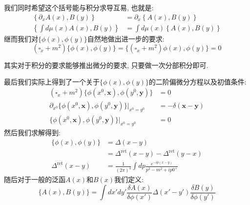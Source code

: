 我们同时希望这个括号能与积分求导互易, 也就是:
\begin{align}
    \left\{\partial_x A(x), B(y)\right\}&=\partial_x\left\{A(x), B(y)\right\}\\
    \left\{\int d\mu(x)A(x), B(y)\right\}&=\int d\mu(x)\left\{A(x), B(y)\right\}
\end{align}
继而我们对$\{\phi(x), \phi(y)\}$自然地做出进一步的要求:
\begin{equation}
    (\square_x+m^2)\{\phi(x), \phi(y)\}=\{(\square_x+m^2)\phi(x), \phi(y)\}=0
\end{equation}
\begin{remark}
    其实对于积分的要求能够推出微分的要求, 只要做一次分部积分即可.
\end{remark}
最后我们实际上得到了一个关于$\{\phi(x), \phi(y)\}$的二阶偏微分方程以及初值条件:
\begin{align}
    (\square_x+m^2)\{\phi(x^0, \mathbf{x}), \phi(y^0, \mathbf{y})\}&=0\\
    \partial_{x^0}\{\phi(x^0, \mathbf{x}), \phi(y^0, \mathbf{y})\}|_{x^0=y^0}&=-\delta(\mathbf{x}-\mathbf{y})\\
    \{\phi(x^0, \mathbf{x}), \phi(y^0, \mathbf{y})\}|_{x^0=y^0}&=0
\end{align}
然后我们求解得到:
\begin{align}
    \{\phi(x), \phi(y)\}&=\Delta(x-y)\\
    &=\Delta^{\text{ret}}(x-y)-\Delta^{\text{ret}}(y-x)\\
    \Delta^{\text{ret}}(x-y)&=\frac{1}{(2\pi)^4}\int dp\frac{e^{-ip(x-y)}}{p^2-m^2+ip0^+}
\end{align}
随后对于一般的泛函$A(x)$和$B(x)$我们定义:
\begin{equation}
    \{A(x), B(y)\}=\int dx'dy'\frac{\delta A(x)}{\delta \phi(x')}\Delta(x'-y')\frac{\delta B(y)}{\delta \phi(y')}
\end{equation}
